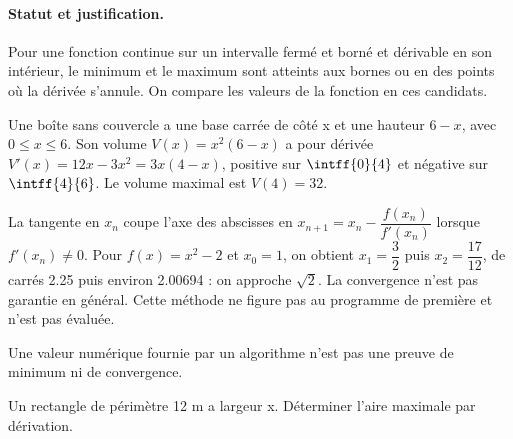 \paragraph{Statut et justification.} Pour une fonction continue sur un intervalle fermé et borné et dérivable en son intérieur, le minimum et le maximum sont atteints aux bornes ou en des points où la dérivée s’annule. On compare les valeurs de la fonction en ces candidats.
\begin{example}Une boîte sans couvercle a une base carrée de côté x et une hauteur $6-x$, avec $0\le x\le6$. Son volume $V(x)=x^2(6-x)$ a pour dérivée $V\prime(x)=12x-3x^2=3x(4-x)$, positive sur $\intff{0}{4}$ et négative sur $\intff{4}{6}$. Le volume maximal est $V(4)=32$.\end{example}\label{C06-EX5}
\begin{beyond}La tangente en $x_n$ coupe l’axe des abscisses en $x_{n+1}=x_n-\dfrac{f(x_n)}{f\prime(x_n)}$ lorsque $f\prime(x_n)\ne0$. Pour $f(x)=x^2-2$ et $x_0=1$, on obtient $x_1=\dfrac{3}{2}$ puis $x_2=\dfrac{17}{12}$, de carrés \num{2,25} puis environ \num{2,00694} : on approche $\sqrt2$. La convergence n’est pas garantie en général. Cette méthode ne figure pas au programme de première et n’est pas évaluée.\end{beyond}
\begin{pitfall}Une valeur numérique fournie par un algorithme n’est pas une preuve de minimum ni de convergence.\end{pitfall}
\begin{application}Un rectangle de périmètre 12 m a largeur x. Déterminer l’aire maximale par dérivation.\end{application}\label{C06-AP5}
\mxnewpage
